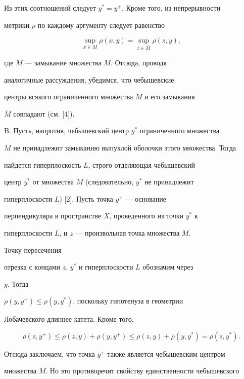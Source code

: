 Из этих соотношений следует $y^{*} = y^{+}$. Кроме того, из непрерывности


метрики $\rho$ по каждому аргументу следует равенство


$$


\sup\limits_{x \in M}{\rho(x,y)} = \sup\limits_{z \in


\overline{M}}{\rho(z,y)},


$$


где $\overline{M}$ --- замыкание множества $M$. Отсюда, проводя


аналогичные рассуждения, убедимся, что чебышевские


центры всякого ограниченного множества $M$ и его замыкания


$\overline{M}$ совпадают (см. [4]).


\smallskip





B. Пусть, напротив, чебышевский центр $y^{*}$ ограниченного множества


$M$ не принадлежит замыканию выпуклой оболочки этого множества. Тогда


найдется гиперплоскость $L$, строго отделяющая чебышевский


центр $y^{*}$ от множества $M$ (следовательно, $y^{*}$ не принадлежит


гиперплоскости $L$) [2]. Пусть точка $y^{+}$ --- основание


перпендикуляра в пространстве $X$, проведенного из точки $y^{*}$ к 


гиперплоскости $L$, и $z$ --- произвольная точка множества $M$.


Точку пересечения


отрезка с концами $z$, $y^{*}$ и гиперплоскости $L$ обозначим через


$y$. Тогда 


$\rho(y,y^{+}) \leq \rho(y,y^{*})$, поскольку гипотенуза в геометрии


Лобачевского длиннее катета. Кроме того, 


$$


\rho(z,y^{+}) \leq \rho(z,y) + \rho(y,y^{+})\leq \rho(z,y) +


\rho(y,y^{*}) = \rho(z,y^{*}).


$$


Отсюда заключаем, что точка $y^{+}$ также является чебышевским центром


множества $M$. Но это противоречит свойству единственности чебышевского



